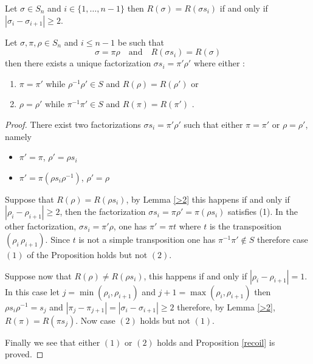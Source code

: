 \documentclass[10pt,a4paper]{amsart}
\begin{document}
\begin{lemma}\label{>2}
Let $\sigma\in S_n$ and  $i\in\{1,\ldots,n-1\}$ then 
$R(\sigma)=R(\sigma s_i)$
 if and only if
$|\sigma_i-\sigma_{i+1}|\geq 2$.
\end{lemma}

\begin{proposition}\label{recoil}
Let $\sigma,\pi,\rho\in S_n$ and $i\leq n-1$ be such that $$\sigma=\pi\rho \quad 
\text{and} \quad R(\sigma s_i)=R(\sigma)$$  then there exists a unique factorization 
$\sigma s_i=\pi'\rho'$ where either : 
\begin{enumerate}
\item
$\pi=\pi'$ while $\rho^{-1}\rho'\in S$ and $R(\rho)=R(\rho')$ or
\item
$\rho=\rho'$ while $\pi^{-1}\pi'\in S$ and $R(\pi)=R(\pi')$ .
\end{enumerate}
\end{proposition}

\begin{proof}
There exist  two factorizations $\sigma s_i=\pi'\rho'$ such that either $\pi=\pi'$ or $\rho=\rho'$, namely

\begin{itemize}
\item
$\pi'=\pi$, $\rho'=\rho s_i$
\item
 $\pi'=\pi(\rho s_i\rho^{-1})$, $\rho'=\rho$
 \end{itemize}

Suppose that $R(\rho)=R(\rho s_i)$, by Lemma \ref{>2} this happens if and only if $|\rho_i-\rho_{i+1}|\geq 2$, then the factorization
$\sigma s_i=\pi\rho'=\pi(\rho s_i)$ satisfies (1). In the other factorization, $\sigma s_i=\pi'\rho$, one has $\pi'=\pi t$ where $t$ is the transposition $(\rho_i\,\rho_{i+1})$. Since $t$ is not a simple transposition one has $\pi^{-1}\pi'\notin S$ therefore  case $(1)$ of the Proposition holds but not $(2)$.

Suppose now that $R(\rho)\ne R(\rho s_i)$,
this happens if and only if $|\rho_i-\rho_{i+1}|=1$. In this case let
$j=\min (\rho_i,\rho_{i+1})$ and $j+1=\max (\rho_i,\rho_{i+1})$ then
$\rho s_i\rho^{-1}=s_j$  and $|\pi_j-\pi_{j+1}|=|\sigma_i-\sigma_{i+1}|\geq 2$ therefore, by Lemma \ref{>2},
$R(\pi)=R(\pi s_j)$. Now case $(2)$ holds but not $(1)$.

Finally we see that  either $(1)$ or $(2)$ holds and  Proposition \ref{recoil} is proved.
\end{proof}
\end{document}

